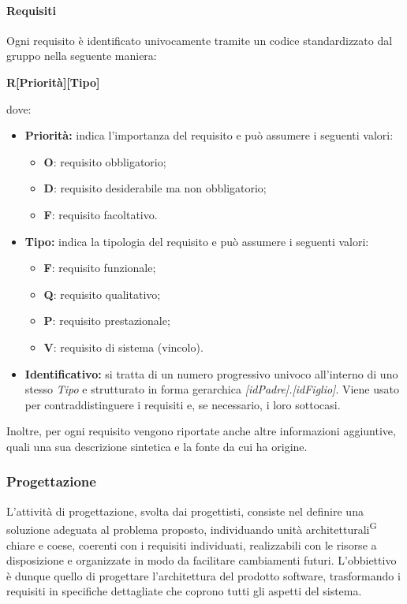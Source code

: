 
\paragraph{Requisiti}
Ogni requisito è identificato univocamente tramite un codice standardizzato dal gruppo nella seguente maniera:
\begin{center}
    \textbf{R[Priorità][Tipo]\textunderscore[Identificativo]}
\end{center}
dove:
\begin{itemize}
    \item \textbf{Priorità:} indica l'importanza del requisito e può assumere i seguenti valori:
        \begin{itemize}
            \item \textbf{O}: requisito obbligatorio;
            \item \textbf{D}: requisito desiderabile ma non obbligatorio;
            \item \textbf{F}: requisito facoltativo.
        \end{itemize}                 
    \item \textbf{Tipo:} indica la tipologia del requisito e può assumere i seguenti valori:
        \begin{itemize}
            \item \textbf{F}: requisito funzionale;
            \item \textbf{Q}: requisito qualitativo;
            \item \textbf{P}: requisito prestazionale;
            \item \textbf{V}: requisito di sistema (vincolo).
        \end{itemize}             
    \item \textbf{Identificativo:} si tratta di un numero progressivo univoco all'interno di uno stesso \textit{Tipo} e strutturato in forma gerarchica \textit{[idPadre].[idFiglio]}. Viene usato per contraddistinguere i requisiti e, se necessario, i loro sottocasi.
\end{itemize}
Inoltre, per ogni requisito vengono riportate anche altre informazioni aggiuntive, quali una sua descrizione sintetica e la fonte da cui ha origine.

\subsubsection{Progettazione}
L'attività di progettazione, svolta dai progettisti, consiste nel definire una soluzione adeguata al problema proposto, individuando unità architetturali\textsuperscript{G} chiare e coese, coerenti con i requisiti individuati, realizzabili con le risorse a disposizione e organizzate in modo da facilitare cambiamenti futuri.
L'obbiettivo è dunque quello di progettare l'architettura del prodotto software, trasformando i requisiti in specifiche dettagliate che coprono tutti gli aspetti del sistema.

